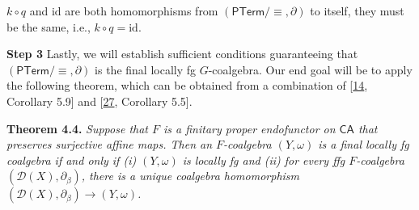 \documentclass[11pt,a4paper]{amsart}
\begin{document}
\hypertarget{html:S4.SS0.SSSx2.p3.m10}{}\({k\circ q}\) and %
\hypertarget{html:S4.SS0.SSSx2.p3.m11}{}\({\mathrm{id}}\) are both homomorphisms from %
\hypertarget{html:S4.SS0.SSSx2.p3.m12}{}\({(\mathsf{PTerm}/{\equiv},\partial)}\) to itself, they must be the same, i.e., %
\hypertarget{html:S4.SS0.SSSx2.p3.m13}{}\({k\circ q=\mathrm{id}}\).
\par\medskip
\hypertarget{html:S4.SS0.SSSx3}{} \par\noindent\textbf{Step 3}\quad  %
\hypertarget{html:S4.SS0.SSSx3.p1}{} Lastly, we will establish sufficient conditions guaranteeing that %
\hypertarget{html:S4.SS0.SSSx3.p1.m1}{}\({(\mathsf{PTerm}/{\equiv},\partial)}\) is the final locally fg %
\hypertarget{html:S4.SS0.SSSx3.p1.m2}{}\({G}\)-coalgebra. Our end goal will be to apply the following theorem, which can be obtained from a combination of [\hyperlink{html:bib.bib14}{14}, Corollary 5.9] and [\hyperlink{html:bib.bib27}{27}, Corollary 5.5].
\par\medskip
\hypertarget{html:S4.Thmtheorem4}{} \par\noindent\textbf{\textbf{Theorem 4.4}\textbf{.}}\quad  %
\hypertarget{html:S4.Thmtheorem4.p1}{} \emph{Suppose that %
\hypertarget{html:S4.Thmtheorem4.p1.m1}{}\({F}\) is a finitary proper endofunctor on %
\hypertarget{html:S4.Thmtheorem4.p1.m2}{}\({\mathsf{CA}}\) that preserves surjective affine maps. Then an %
\hypertarget{html:S4.Thmtheorem4.p1.m3}{}\({F}\)-coalgebra %
\hypertarget{html:S4.Thmtheorem4.p1.m4}{}\({(Y,\omega)}\) is a final locally fg coalgebra if and only if (i) %
\hypertarget{html:S4.Thmtheorem4.p1.m5}{}\({(Y,\omega)}\) is locally fg and (ii) for every ffg %
\hypertarget{html:S4.Thmtheorem4.p1.m6}{}\({F}\)-coalgebra %
\hypertarget{html:S4.Thmtheorem4.p1.m7}{}\({({\mathcal{D}}(X),\partial_{\beta})}\), there is a unique coalgebra homomorphism %
\hypertarget{html:S4.Thmtheorem4.p1.m8}{}\({({\mathcal{D}}(X),\partial_{\beta})\to(Y,\omega)}\).}
\par\medskip
\end{document}
